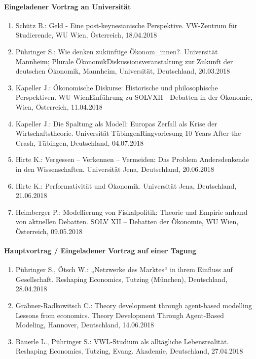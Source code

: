 \paragraph{Eingeladener Vortrag an Universität}
\begin{enumerate}
	\item Schütz B.: Geld - Eine post-keynesianische Perspektive. VW-Zentrum für Studierende, WU Wien, Österreich, 18.04.2018
	\item Pühringer S.: Wie denken zukünftige Ökonom\_innen?. Universität Mannheim; Plurale ÖkonomikDiskussionsveranstaltung zur Zukunft der deutschen Ökonomik, Mannheim, Universität, Deutschland, 20.03.2018
	\item Kapeller J.: Ökonomische Diskurse: Historische und philosophische Perspektiven. WU WienEinführung zu SOLVXII - Debatten in der Ökonomie, Wien, Österreich, 11.04.2018
	\item Kapeller J.: Die Spaltung als Modell: Europas Zerfall als Krise der Wirtschaftstheorie. Universität TübingenRingvorlesung 10 Years After the Crash, Tübingen, Deutschland, 04.07.2018
	\item Hirte K.: Vergessen – Verkennen – Vermeiden: Das Problem Andersdenkende in den Wissenschaften. Universität Jena, Deutschland, 20.06.2018
	\item Hirte K.: Performativität und Ökonomik. Universität Jena, Deutschland, 21.06.2018
	\item Heimberger P.: Modellierung von Fiskalpolitik: Theorie und Empirie anhand von aktuellen Debatten. SOLV XII – Debatten der Ökonomie, WU Wien, Österreich, 09.05.2018
\end{enumerate}
\paragraph{Hauptvortrag / Eingeladener Vortrag auf einer Tagung}
\begin{enumerate}
	\item Pühringer S., Ötsch W.: „Netzwerke des Marktes“ in ihrem Einfluss auf Gesellschaft. Reshaping Economics, Tutzing (München), Deutschland, 28.04.2018
	\item Gräbner-Radkowitsch C.: Theory development through agent-based modelling Lessons from economics. Theory Development Through Agent-Based Modeling, Hannover, Deutschland, 14.06.2018
	\item Bäuerle L., Pühringer S.: VWL-Studium als alltägliche Lebensrealität. Reshaping Economics, Tutzing, Evang. Akademie, Deutschland, 27.04.2018
\end{enumerate}

